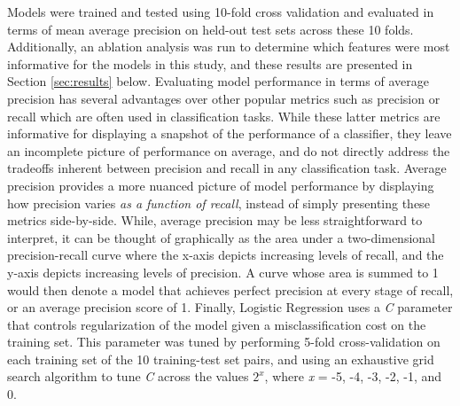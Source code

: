 \documentclass[twoside]{article}
\begin{document}
Models were trained and tested using 10-fold cross validation and evaluated in terms of mean average precision on held-out test sets across these 10 folds. Additionally, an ablation analysis was run to determine which features were most informative for the models in this study, and these results are presented in Section \ref{sec:results} below. Evaluating model performance in terms of average precision has several advantages over other popular metrics such as precision or recall which are often used in classification tasks. While these latter metrics are informative for displaying a snapshot of the performance of a classifier, they leave an incomplete picture of performance on average, and do not directly address the tradeoffs inherent between precision and recall in any classification task. Average precision provides a more nuanced picture of model performance by displaying how precision varies \emph{as a function of recall}, instead of simply presenting these metrics side-by-side. While, average precision may be less straightforward to interpret, it can be thought of graphically as the area under a two-dimensional precision-recall curve where the x-axis depicts increasing levels of recall, and the y-axis depicts increasing levels of precision. A curve whose area is summed to 1 would then denote a model that achieves perfect precision at every stage of recall, or an average precision score of 1. Finally, Logistic Regression uses a \emph{C} parameter that controls regularization of the model given a misclassification cost on the training set. This parameter was tuned by performing 5-fold cross-validation on each training set of the 10 training-test set pairs, and using an exhaustive grid search algorithm to tune \emph{C} across the values $2^x$, where \emph{x} = -5, -4, -3, -2, -1, and 0. 

\end{document}
